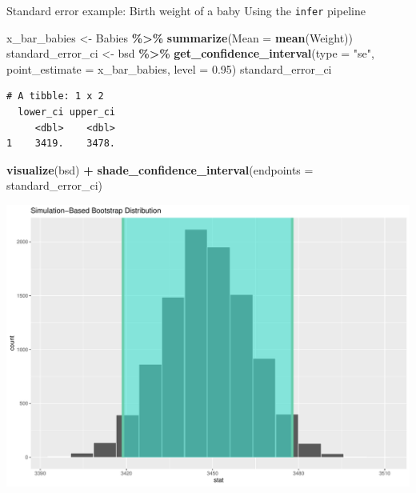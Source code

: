 \documentclass[
  ignorenonframetext,
]{beamer}
\newenvironment{Shaded}{\begin{snugshade}}{\end{snugshade}}
\newcommand{\AttributeTok}[1]{\textcolor[rgb]{0.13,0.29,0.53}{#1}}
\newcommand{\FloatTok}[1]{\textcolor[rgb]{0.00,0.00,0.81}{#1}}
\newcommand{\FunctionTok}[1]{\textcolor[rgb]{0.13,0.29,0.53}{\textbf{#1}}}
\newcommand{\NormalTok}[1]{#1}
\newcommand{\OtherTok}[1]{\textcolor[rgb]{0.56,0.35,0.01}{#1}}
\newcommand{\SpecialCharTok}[1]{\textcolor[rgb]{0.81,0.36,0.00}{\textbf{#1}}}
\newcommand{\StringTok}[1]{\textcolor[rgb]{0.31,0.60,0.02}{#1}}
\begin{document}
\begin{frame}[fragile]{Standard error example: Birth weight of a baby}
\protect\hypertarget{standard-error-example-birth-weight-of-a-baby}{}
Using the \texttt{infer} pipeline

\tiny

\begin{Shaded}
\begin{Highlighting}[]
\NormalTok{x\_bar\_babies }\OtherTok{\textless{}{-}}\NormalTok{ Babies }\SpecialCharTok{\%\textgreater{}\%} \FunctionTok{summarize}\NormalTok{(}\AttributeTok{Mean =} \FunctionTok{mean}\NormalTok{(Weight))}
\NormalTok{standard\_error\_ci }\OtherTok{\textless{}{-}}\NormalTok{ bsd }\SpecialCharTok{\%\textgreater{}\%} 
  \FunctionTok{get\_confidence\_interval}\NormalTok{(}\AttributeTok{type =} \StringTok{"se"}\NormalTok{, }\AttributeTok{point\_estimate =}\NormalTok{ x\_bar\_babies, }\AttributeTok{level =} \FloatTok{0.95}\NormalTok{)}
\NormalTok{standard\_error\_ci}
\end{Highlighting}
\end{Shaded}

\begin{verbatim}
# A tibble: 1 x 2
  lower_ci upper_ci
     <dbl>    <dbl>
1    3419.    3478.
\end{verbatim}

\begin{Shaded}
\begin{Highlighting}[]
\FunctionTok{visualize}\NormalTok{(bsd) }\SpecialCharTok{+} 
  \FunctionTok{shade\_confidence\_interval}\NormalTok{(}\AttributeTok{endpoints =}\NormalTok{ standard\_error\_ci)}
\end{Highlighting}
\end{Shaded}

\begin{center}\includegraphics[width=0.7\linewidth,height=0.4\textheight]{Week10_Lect_files/figure-beamer/unnamed-chunk-21-1} \end{center}
\normalsize
\end{frame}
\end{document}
